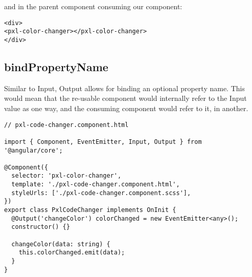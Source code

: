 and in the parent component consuming our component:

\begin{lstlisting}
<div>
<pxl-color-changer></pxl-color-changer>
</div>
\end{lstlisting}

\subsection{ bindPropertyName }
Similar to Input, Output allows for binding an optional property name. This
would mean that the re-usable component would internally refer to the Input
value as one way, and the consuming component would refer to it, in another.

\begin{lstlisting}
// pxl-code-changer.component.html

import { Component, EventEmitter, Input, Output } from '@angular/core';

@Component({
  selector: 'pxl-color-changer',
  template: './pxl-code-changer.component.html',
  styleUrls: ['./pxl-code-changer.component.scss'],
})
export class PxlCodeChanger implements OnInit {
  @Output('changeColor') colorChanged = new EventEmitter<any>();
  constructor() {}

  changeColor(data: string) {
    this.colorChanged.emit(data);
  }
}
\end{lstlisting}
